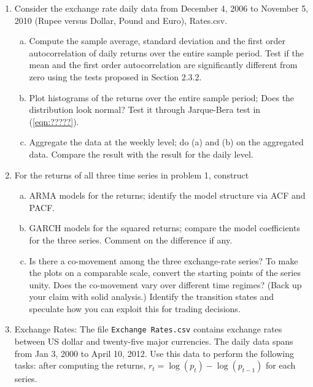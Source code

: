 \begin{enumerate}[1.]
\item Consider the exchange rate daily data from December 4, 2006 to November 5, 2010 (Rupee versus Dollar, Pound and Euro), Rates.csv.
\begin{enumerate}[(a)]
\item Compute the sample average, standard deviation and the first order autocorrelation of daily returns over the entire sample period.  Test if the mean and the first order autocorrelation are significantly different from zero using the tests proposed in Section 2.3.2. 

\item Plot histograms of the returns over the entire sample period; Does the distribution look normal?  Test it through Jarque-Bera test in (\ref{eqn:?????}).

\item Aggregate the data at the weekly level; do (a) and (b) on the aggregated data. Compare the result with the result for the daily level.
\end{enumerate}

\item For the returns of all three time series in problem 1,  construct
\begin{enumerate}[(a)]
\item ARMA models for the returns; identify the model structure via ACF and PACF.

\item  GARCH models for the squared returns; compare the model coefficients for the three series.  Comment on the difference if any.

\item Is there a co-movement among the three exchange-rate series? To make the plots on a comparable scale, convert the starting points of the series unity. Does the co-movement vary over different time regimes? (Back up your claim with solid analysis.) Identify the transition states and speculate how you can exploit this for trading decisions. 
\end{enumerate}

\item Exchange Rates: The file \texttt{Exchange Rates.csv} contains exchange rates between US dollar and twenty-five major currencies. The daily data spans from Jan 3, 2000 to April 10, 2012. Use this data to perform the following tasks: after computing the returns, $r_t=\log(p_t)-\log(p_{t-1})$ for each series.


\end{enumerate}
